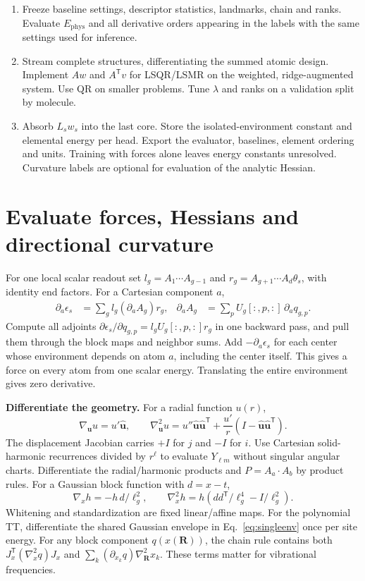 \documentclass[11pt,a4paper]{article}
\newcommand{\T}{\mathsf T}\newcommand{\tr}{\operatorname{tr}}
\newcommand{\phys}{\mathrm{phys}}\newcommand{\refm}{\mathrm{ref}}
\newcommand{\D}{\partial}\newcommand{\alg}[1]{\par\smallskip{\sffamily\bfseries\color{tealblue}#1}\par\nobreak}
\begin{document}
\alg{Algorithm 3. Fit and export}
\begin{enumerate}
\item Freeze baseline settings, descriptor statistics, landmarks, chain and ranks. Evaluate $E_{\phys}$ and all derivative orders appearing in the labels with the same settings used for inference.
\item Stream complete structures, differentiating the summed atomic design. Implement $Aw$ and $A^\T v$ for LSQR/LSMR on the weighted, ridge-augmented system. Use QR on smaller problems. Tune $\lambda$ and ranks on a validation split by molecule.
\item Absorb $L_sw_s$ into the last core. Store the isolated-environment constant and elemental energy per head. Export the evaluator, baselines, element ordering and units. Training with forces alone leaves energy constants unresolved. Curvature labels are optional for evaluation of the analytic Hessian.
\end{enumerate}
\pg\section{Evaluate forces, Hessians and directional curvature}
For one local scalar readout set $l_g=A_1\cdots A_{g-1}$ and $r_g=A_{g+1}\cdots A_d\theta_s$, with identity end factors. For a Cartesian component $a$,
\begin{align}
 \D_a\epsilon_s&=\sum_g l_g(\D_a A_g)r_g,&
 \D_a A_g&=\sum_p U_g[:,p,:]\,\D_a q_{g,p}. \label{eq:force}
\end{align}
Compute all adjoints $\D\epsilon_s/\D q_{g,p}=l_g U_g[:,p,:]r_g$ in one backward pass, and pull them through the block maps and neighbor sums. Add $-\D_a\epsilon_s$ for each center whose environment depends on atom $a$, including the center itself. This gives a force on every atom from one scalar energy. Translating the entire environment gives zero derivative.

\textbf{Differentiate the geometry.} For a radial function $u(r)$,
\[
 \nabla_{\mathbf u}u=u'\hat{\mathbf u},\qquad
 \nabla^2_{\mathbf u}u=u''\hat{\mathbf u}\hat{\mathbf u}^\T+
 \frac{u'}{r}(I-\hat{\mathbf u}\hat{\mathbf u}^\T).
\]
The displacement Jacobian carries $+I$ for $j$ and $-I$ for $i$. Use Cartesian solid-harmonic recurrences divided by $r^\ell$ to evaluate $Y_{\ell m}$ without singular angular charts. Differentiate the radial/harmonic products and $P=A_a\cdot A_b$ by product rules. For a Gaussian block function with $d=x-t$,
\[
 \nabla_x h=-h\,d/\ell_g^2,\qquad
 \nabla_x^2h=h(dd^\T/\ell_g^4-I/\ell_g^2).
\]
Whitening and standardization are fixed linear/affine maps. For the polynomial TT, differentiate the shared Gaussian envelope in Eq.~\eqref{eq:singleenv} once per site energy. For any block component $q(x(\mathbf R))$, the chain rule contains both $J_x^\T(\nabla_x^2q)J_x$ and $\sum_k(\D_{x_k}q)\nabla_{\mathbf R}^2x_k$. These terms matter for vibrational frequencies.
\end{document}
